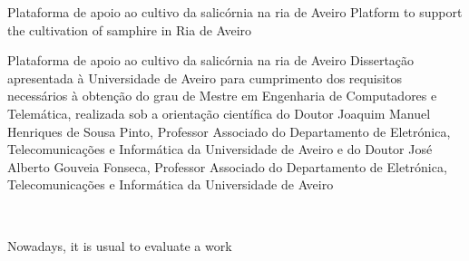 

\TitlePage
         {\ThesisYear}
        {Plataforma de apoio ao cultivo da salicórnia na ria  de Aveiro}
    \vspace*{9mm}
  \TITLE{ }
        {Platform to support the cultivation of samphire in Ria de Aveiro}
\EndTitlePage
\titlepage\
\endtitlepage %


\TitlePage
\EndTitlePage


%
%
\newpage 

\TitlePage
  \HEADER{}{\ThesisYear}
        {Plataforma de apoio ao cultivo da salicórnia na ria  de Aveiro}
  \vspace*{15mm}
  \TEXT{}
       {Dissertação apresentada à Universidade de Aveiro para cumprimento dos requisitos necessários à obtenção do grau de Mestre em Engenharia de Computadores e Telemática, realizada sob a orientação científica do Doutor Joaquim Manuel Henriques de Sousa Pinto, Professor Associado do Departamento de Eletrónica, Telecomunicações e Informática da Universidade de Aveiro e do Doutor José Alberto Gouveia Fonseca, Professor Associado do Departamento de Eletrónica, Telecomunicações e Informática da Universidade de Aveiro }

\EndTitlePage
\titlepage\
\endtitlepage %



\TitlePage
 \vspace*{55mm}

       {Nowadays, it is usual to evaluate a work 
       \\ \\ 
       }

